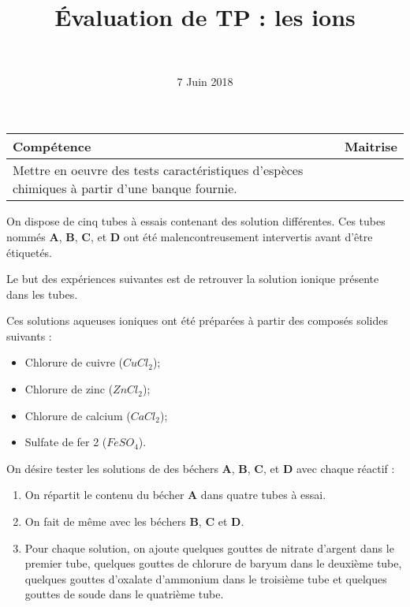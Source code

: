 \documentclass[a4paper,11pt]{exam}
\author{\ }
\date{7 Juin 2018}
\title{\'Evaluation de TP : les ions}
\begin{document}
%	
\maketitle
	
\begin{small}
	\begin{center}
		\begin{tabular}{|@{\ }l@{}|@{\ }c@{\ }|}
			\hline
			\textbf{Compétence} & \textbf{Maitrise} \\
			\hline
			Mettre en oeuvre des tests caractéristiques d’espèces chimiques à partir d’une banque fournie. \ &  \ \ \ \\
			\hline
		\end{tabular}
	\end{center}
\end{small}	

On dispose de cinq tubes à essais contenant des solution différentes. Ces tubes nommés $\mathbf{A}$, $\mathbf{B}$, $\mathbf{C}$, et $\mathbf{D}$ ont été malencontreusement intervertis avant d'être étiquetés. 

Le but des expériences suivantes est de retrouver la solution ionique présente dans les tubes.

Ces solutions aqueuses ioniques ont été préparées à partir des composés solides suivants :

\begin{itemize}
	\item Chlorure de cuivre ($CuCl_2 $);
	\item Chlorure de zinc ($ZnCl_2 $);
	\item Chlorure de calcium ($CaCl_2 $);
	\item Sulfate de fer 2 ($FeSO_4 $).
\end{itemize}


On désire tester les solutions de des béchers $\mathbf{A}$, $\mathbf{B}$, $\mathbf{C}$, et $\mathbf{D}$ avec chaque réactif :

\begin{enumerate}
	\item On répartit le contenu du bécher $\mathbf{A}$ dans quatre tubes à essai.
	\item On fait de même avec les béchers $\mathbf{B}$, $\mathbf{C}$ et $\mathbf{D}$.
	\item Pour chaque solution, on ajoute quelques gouttes de nitrate d'argent  dans le premier tube, quelques gouttes de chlorure de baryum dans le deuxième tube, quelques gouttes d'oxalate d'ammonium dans le troisième tube et quelques gouttes de soude dans le quatrième tube.
\end{enumerate}
\end{document}

